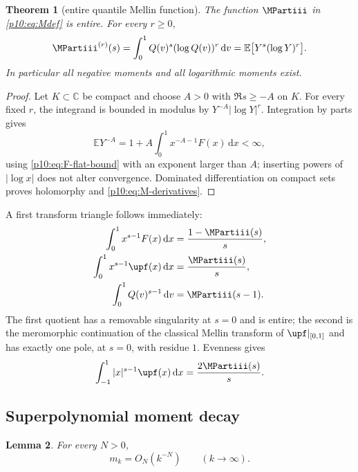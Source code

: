 \documentclass[11pt,oneside]{article}
\newtheorem{theorem}{Theorem}[section]
\newtheorem{lemma}[theorem]{Lemma}
\theoremstyle{definition}
\theoremstyle{remark}
\newcommand{\F}{F}
\newcommand{\Q}{Q}
\newcommand{\E}{\mathbb E}
\newcommand{\C}{\mathbb C}
\newcommand{\dd}{\,\mathrm d}
\newcommand{\1}{\mathbf 1}
\begin{document}
\begin{theorem}[entire quantile Mellin function]\label{p10:thm:entireM}
The function \(\MPartiii\) in \cref{p10:eq:Mdef} is entire.  For every \(r\ge0\),
\begin{equation}\label{p10:eq:M-derivatives}
 \MPartiii^{(r)}(s)=\int_0^1\Q(v)^s(\log\Q(v))^r\dd v
 =\E\bigl[Y^s(\log Y)^r\bigr].
\end{equation}
In particular all negative moments and all logarithmic moments exist.
\end{theorem}

\begin{proof}
Let \(K\subset\C\) be compact and choose \(A>0\) with \(\Re s\ge-A\) on \(K\).
For every fixed \(r\), the integrand is bounded in modulus by
\(Y^{-A}|\log Y|^r\).  Integration by parts gives
\[
 \E Y^{-A}=1+A\int_0^1x^{-A-1}\F(x)\dd x<\infty,
\]
using \cref{p10:eq:F-flat-bound} with an exponent larger than \(A\); inserting powers of
\(|\log x|\) does not alter convergence.  Dominated differentiation on compact sets
proves holomorphy and \cref{p10:eq:M-derivatives}.
\end{proof}

A first transform triangle follows immediately:
\begin{align}
 \int_0^1x^{s-1}\F(x)\dd x&=\frac{1-\MPartiii(s)}s,
 \label{p10:eq:Mellin-F}\\
 \int_0^1x^{s-1}\upf(x)\dd x&=\frac{\MPartiii(s)}s,
 \label{p10:eq:Mellin-up-half}\\
 \int_0^1\Q(v)^{s-1}\dd v&=\MPartiii(s-1).
 \label{p10:eq:Mellin-Q}
\end{align}
The first quotient has a removable singularity at \(s=0\) and is entire; the second
is the meromorphic continuation of the classical Mellin transform of \(\upf|_{[0,1]}\)
and has exactly one pole, at \(s=0\), with residue \(1\).  Evenness gives
\begin{equation}\label{p10:eq:absolute-Mellin-up}
 \int_{-1}^1|x|^{s-1}\upf(x)\dd x=\frac{2\MPartiii(s)}s.
\end{equation}

\subsection{Superpolynomial moment decay}

\begin{lemma}\label{p10:lem:moment-decay}
For every \(N>0\),
\begin{equation}\label{p10:eq:moment-decay}
 m_k=O_N(k^{-N})\qquad(k\to\infty).
\end{equation}
\end{lemma}
\end{document}
